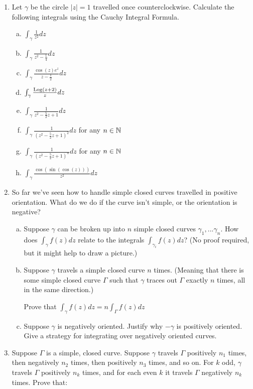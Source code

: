 \begin{enumerate}
\item Let $\gamma$ be the circle $|z| = 1$ travelled once counterclockwise. Calculate the following integrals using the Cauchy Integral Formula.

\begin{enumerate}[a)]
\item $\int_{\gamma} \frac{1}{z^2}dz$
\item $\int_{\gamma} \frac{1}{z^2 - \frac{1}{4}}dz$
\item $\int_{\gamma} \frac{\cos(z)e^z}{z - \frac{1}{2}}dz$
\item $\int_{\gamma} \frac{\mathrm{Log}(z + 2)}{z}dz$
\item $\int_{\gamma} \frac{1}{z^2 - \frac{5}{2}z + 1}dz$
\item $\int_{\gamma} \frac{1}{(z^2 - \frac{5}{2}z + 1)^2} dz$ for any $n \in \mathbb{N}$
\item $\int_{\gamma} \frac{1}{(z^2 - \frac{5}{2}z + 1)^n} dz$ for any $n \in \mathbb{N}$
\item $\int_{\gamma} \frac{\cos(\sin(\cos(z)))}{z^2}dz$
\end{enumerate}

\item So far we've seen how to handle simple closed curves travelled in positive orientation. What do we do if the curve isn't simple, or the orientation is negative?

\begin{enumerate}[a)]
\item Suppose $\gamma$ can be broken up into $n$ simple closed curves $\gamma_1,...\gamma_n$. How does $\int_{\gamma} f(z)dz$ relate to the integrals $\int_{\gamma_i} f(z)dz$? (No proof required, but it might help to draw a picture.)
\item Suppose $\gamma$ travels a simple closed curve $n$ times. (Meaning that there is some simple closed curve $\Gamma$ such that $\gamma$ traces out $\Gamma$ exactly $n$ times, all in the same direction.)

\vspace{10pt}

Prove that $\int_\gamma f(z)dz = n \int_\Gamma f(z)dz$

\item Suppose $\gamma$ is negatively oriented. Justify why $-\gamma$ is positively oriented. Give a strategy for integrating over negatively oriented curves.
\end{enumerate}


\item Suppose $\Gamma$ is a simple, closed curve. Suppose $\gamma$ travels $\Gamma$ positively $n_1$ times, then negatively $n_2$ times, then positively $n_3$ times, and so on. For $k$ odd, $\gamma$ travels $\Gamma$ positively $n_k$ times, and for each even $k$ it travels $\Gamma$ negatively $n_k$ times. Prove that:


\end{enumerate}
